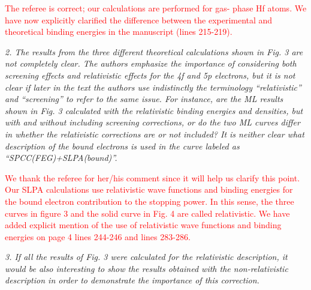 \documentclass[a4paper,10pt]{article}
\def\reviewer#1{\vspace{0.35cm}\textsl{#1}}
\def\reply#1{\vspace{0.1cm}\textcolor{red}{#1}}
\begin{document}
\reply{The referee is correct; our calculations are performed for gas-
phase Hf atoms. We have now explicitly clarified the difference between 
the experimental and theoretical binding energies in the manuscript 
(lines 215-219).}

\reviewer{2. The results from the three different theoretical
calculations shown in Fig. 3 are not completely clear. The authors
emphasize the importance of considering both screening effects and
relativistic effects for the 4f and 5p electrons, but it is not clear if
later in the text the authors use indistinctly the terminology
``relativistic'' and ``screening'' to refer to the same issue. For
instance, are the ML results shown in Fig. 3 calculated with the
relativistic binding energies and densities, but with and without
including screening corrections, or do the two ML curves differ in
whether the relativistic corrections are or not included? It is neither
clear what description of the bound electrons is used in the curve
labeled as ``SPCC(FEG)+SLPA(bound)''.}

\reply{We thank the referee for her/his comment since it will help us 
clarify this point. Our SLPA calculations use relativistic wave 
functions and binding energies for the bound electron contribution to 
the stopping power. In this sense, the three curves in figure 3 and the 
solid curve in Fig. 4 are called relativistic. We have added explicit 
mention of the use of relativistic wave functions and binding energies 
on page 4 lines 244-246 and lines 283-286.}

\reviewer{3. If all the results of Fig. 3 were calculated for the 
relativistic description, it would be also interesting to show the
results obtained with the non-relativistic description in order to
demonstrate the importance of this correction.}
\end{document}
